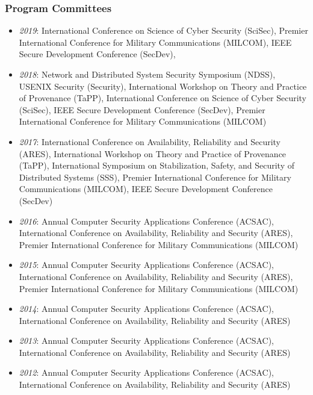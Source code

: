 \hypertarget{program-committees}{%
\subsubsection{Program Committees}\label{program-committees}}
\begin{itemize}
\tightlist
\item
  \emph{2019}: International Conference on Science of Cyber Security (SciSec),
  Premier International Conference for Military Communications (MILCOM),
  IEEE Secure Development Conference (SecDev),
\item
  \emph{2018}: Network and Distributed System Security Symposium (NDSS),
  USENIX Security (Security),
  International Workshop on Theory and Practice of Provenance (TaPP),
  International Conference on Science of Cyber Security (SciSec),
  IEEE Secure Development Conference (SecDev),
  Premier International Conference for Military Communications (MILCOM)
\item
  \emph{2017}: International Conference on Availability, Reliability and Security (ARES),
  International Workshop on Theory and Practice of Provenance (TaPP),
  International Symposium on Stabilization, Safety, and Security of Distributed Systems (SSS),
  Premier International Conference for Military Communications (MILCOM),
  IEEE Secure Development Conference (SecDev)
\item
  \emph{2016}: Annual Computer Security Applications Conference (ACSAC),
  International Conference on Availability, Reliability and Security (ARES),
  Premier International Conference for Military Communications (MILCOM)
\item
  \emph{2015}: Annual Computer Security Applications Conference (ACSAC),
  International Conference on Availability, Reliability and Security (ARES),
  Premier International Conference for Military Communications (MILCOM)
\item
  \emph{2014}: Annual Computer Security Applications Conference (ACSAC),
  International Conference on Availability, Reliability and Security (ARES)
\item
  \emph{2013}: Annual Computer Security Applications Conference (ACSAC),
  International Conference on Availability, Reliability and Security (ARES)
\item
  \emph{2012}: Annual Computer Security Applications Conference (ACSAC),
  International Conference on Availability, Reliability and Security (ARES)
\end{itemize}

